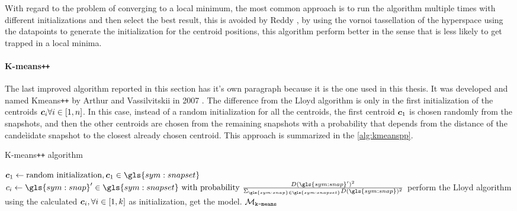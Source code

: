 With regard to the problem of converging to a local minimum, the most common approach is to run the algorithm multiple times with different initializations and then select the best result, this is avoided by Reddy \cite{Vornoi_Kmeans}, by using the vornoi tassellation of the hyperspace using the datapoints to generate the initialization for the centroid positions, this algorithm perform better in the sense that is less likely to get trapped in a local minima.


\paragraph{K-means\texttt{++}} 
The last improved algorithm reported in this section has it's own paragraph because it is the one used in this thesis. It was developed and named Kmeans\texttt{++} by Arthur and Vassilvitskii in 2007 \cite{Kmeanspp}. The difference from the Lloyd algorithm is only in the first initialization of the centroids $\bm{c}_i \forall i \in [1,n]$. In this case, instead of a random initialization for all the centroids, the first centroid $\bm{c}_1$ is chosen randomly from the snapshots, and then the other centroids are chosen from the remaining snapshots with a probability that depends from the distance of the candeìidate snapshot to the closest already chosen centroid. This approach is summarized in the \autoref{alg:kmeanspp}.

\begin{algorithm}
  \caption{K-means\texttt{++} algorithm}
  \label{alg:kmeanspp}
\begin{algorithmic}[1]
  \State $\vect{c}_1 \gets \text{random initialization}, \vect{c}_1 \in \gls{sym:snapset}$
  \State $c_i \gets \gls{sym:snap}' \in \gls{sym:snapset} \text{ with probability } \frac{D(\gls{sym:snap}')^2}{\Sigma_{\gls{sym:snap}\in\gls{sym:snapset}}D(\gls{sym:snap})^2}$
  \EndFor
  \State perform the Lloyd algorithm using the calculated $\bm{c}_i, \forall i \in [1,k]$ as initialization, get the model.
  \State \Return $\mathcal{M}_{\text{\texttt{k-means}}}$  
  \EndFunction
\end{algorithmic}
\end{algorithm}

